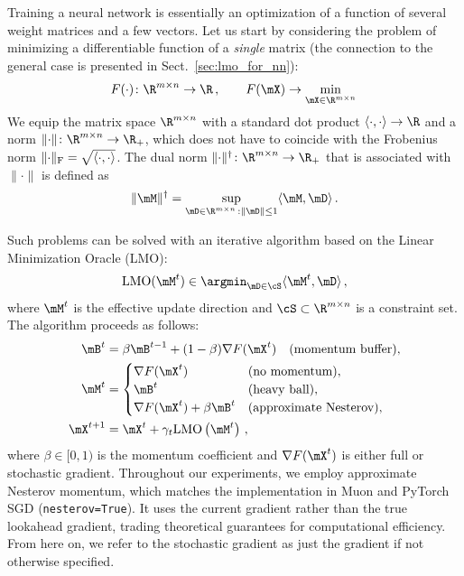 \documentclass[smallextended,referee,envcountsect]{svjour3}
\newcommand{\norm}[1]{\lVert #1\rVert}
\DeclarePairedDelimiter{\normf}{\|}{\|_\mathrm{F}}
\def\<#1,#2>{\langle #1,#2\rangle}
\newcommand{\Rmn}{\R^{m\times n}}
\newcommand{\sectionref}[1]{Sect.~\ref{#1}}
\begin{document}
 Training a neural network is essentially an optimization of a function of several weight matrices and a few vectors. Let us start by considering the problem of minimizing a differentiable function of a \emph{single} matrix (the connection to the general case is presented in \sectionref{sec:lmo_for_nn}):
 \begin{equation}\label{eq:matrix_problem}
   F(\cdot)\colon \Rmn \to \R\,,\qquad F(\mX) \to \min_{\mX \in \Rmn}\,
 \end{equation}
 We equip the matrix space $\Rmn$ with a standard dot product $\<\cdot, \cdot> \to \R$ and a norm $\norm{\cdot}\colon \Rmn \to \R_+$, which does not have to coincide with the Frobenius norm $\normf{\cdot} = \sqrt{\<\cdot,\cdot>}$. The dual norm $\norm{\cdot}^\dagger\colon \Rmn \to \R_+$ that is associated with $\norm{\cdot}$ is defined as
 \begin{equation}\label{eq:dual_norm}
   \norm{\mM}^\dagger = \sup_{\mD \in \Rmn\,:\norm{\mD}\leq 1} \<\mM,\mD>\,.
 \end{equation}
 
 Such problems can be solved with an iterative algorithm based on the Linear Minimization Oracle (LMO):
 \begin{equation}\label{eq:lmo}
   \mathrm{LMO}(\mM^t) \in \argmin_{\mD \in \cS} \langle\mM^t, \mD\rangle\,,
 \end{equation}
 where $\mM^t$ is the effective update direction and $\cS \subset \Rmn$ is a constraint set. The algorithm proceeds as follows:
 \begin{equation}\label{eq:simple_update}
   \begin{aligned}
   \mB^t &= \beta \mB^{t-1} + (1 - \beta) \nabla F(\mX^t) \quad \text{(momentum buffer)},\\
   \mM^t &= \begin{cases}
   \nabla F(\mX^t) & \text{(no momentum)},\\
   \mB^t & \text{(heavy ball)},\\
   \nabla F(\mX^t) + \beta \mB^t & \text{(approximate Nesterov)},
   \end{cases}\\
   \mX^{t + 1} &= \mX^t + \gamma_t\mathrm{LMO}\left(\mM^t\right)\,,
   \end{aligned}
 \end{equation}
 where $\beta \in [0, 1)$ is the momentum coefficient and $\nabla F(\mX^t)$ is either full or stochastic gradient. Throughout our experiments, we employ approximate Nesterov momentum, which matches the implementation in Muon and PyTorch SGD (\texttt{nesterov=True}). It uses the current gradient rather than the true lookahead gradient, trading theoretical guarantees for computational efficiency. From here on, we refer to the stochastic gradient as just the gradient if not otherwise specified.
 
\end{document}
